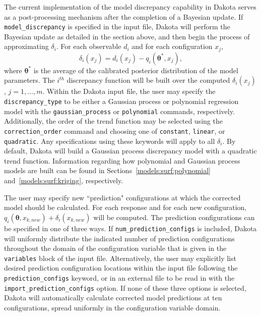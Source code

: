 The current implementation of the model discrepancy capability in Dakota 
serves as a post-processing mechanism after the completion of a Bayesian update.
If \texttt{model\_discrepancy} is specified in the input file, Dakota will 
perform the Bayesian update as detailed in the section above, and then begin 
the process of approximating $\delta_i$. For each observable $d_i$ and for 
each configuration $x_j$,
\begin{equation}
\delta_i \left( x_j \right) = d_i \left( x_j \right) - 
q_i \left(\boldsymbol{\theta}^*, x_j \right),
\end{equation}
where $\boldsymbol{\theta}^*$ is the average of the calibrated posterior 
distribution of the model parameters. The $i^{th}$ discrepancy function
will be built over the computed $\delta_i \left( x_j \right)$, $j = 1, \ldots,
m$. Within the Dakota input file, the user may specify the 
\texttt{discrepancy\_type} to be either a Gaussian process or polynomial
regression model with the \texttt{gaussian\_process} or \texttt{polynomial}
commands, respectively. Additionally, the order of the trend function may be
selected using the \texttt{correction\_order} command and choosing one of
\texttt{constant}, \texttt{linear}, or \texttt{quadratic}. Any specifications
using these keywords will apply to all $\delta_i$. By default, Dakota will 
build a Gaussian process discrepancy model with a quadratic trend function.
Information regarding how polynomial and Gaussian process models are built
can be found in Sections~\ref{models:surf:polynomial} 
and~\ref{models:surf:kriging}, respectively. 

The user may specify new ``prediction" configurations at which the 
corrected model should be calculated. For each response and for each new
configuration, $q_i(\boldsymbol{\theta}, x_{k,new}) + \delta_i(x_{k,new})$ 
will be computed. The prediction configurations can be specified in one of
three ways. If \texttt{num\_prediction\_configs} is included, Dakota will 
uniformly distribute the indicated number of prediction configurations 
throughout the domain of the configuration variable that is given in the 
\texttt{variables} block of the input file. Alternatively, the user may 
explicitly list desired prediction configuration locations within the input
file following the \texttt{prediction\_configs} keyword, or in an external
file to be read in with the \texttt{import\_prediction\_configs} option. If 
none of these three options is selected, Dakota will automatically calculate
corrected model predictions at ten configurations, spread uniformly in the
configuration variable domain. 

